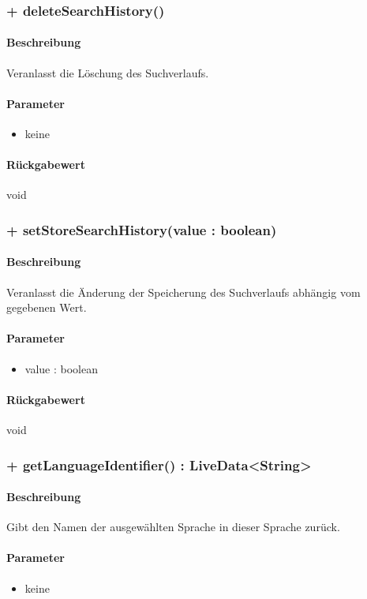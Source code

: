 \subsubsection{+ deleteSearchHistory()}%
\paragraph*{Beschreibung}
Veranlasst die Löschung des Suchverlaufs.
\paragraph*{Parameter}
\begin{itemize}
    \item keine
\end{itemize}
\paragraph*{Rückgabewert}
void

\subsubsection{+ setStoreSearchHistory(value : boolean)}%
\paragraph*{Beschreibung}
Veranlasst die Änderung der Speicherung des Suchverlaufs abhängig vom gegebenen Wert.
\paragraph*{Parameter}
\begin{itemize}
    \item value : boolean
\end{itemize}
\paragraph*{Rückgabewert}
void

\subsubsection{+ getLanguageIdentifier() : LiveData<String>}%
\paragraph*{Beschreibung}
Gibt den Namen der ausgewählten Sprache in dieser Sprache zurück.
\paragraph*{Parameter}
\begin{itemize}
    \item keine
\end{itemize}
